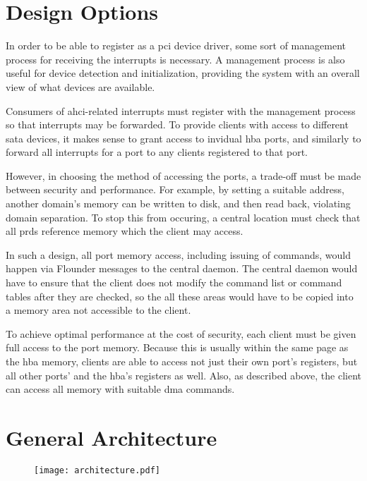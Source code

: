 \section{Design Options}

In order to be able to register as a \acs{pci} device driver, some sort of
management process for receiving the interrupts is necessary. A management
process is also useful for device detection and initialization, providing the
system with an overall view of what devices are available.

Consumers of \ac{ahci}-related interrupts must register with the management
process so that interrupts may be forwarded. To provide clients with access to
different \ac{sata} devices, it makes sense to grant access to invidual
\ac{hba} ports, and similarly to forward all interrupts for a port to any
clients registered to that port.

However, in choosing the method of accessing the ports, a trade-off must be
made between security and performance. For example, by setting a suitable
address, another domain's memory can be written to disk, and then read back,
violating domain separation. To stop this from occuring, a central location
must check that all \acp{prd} reference memory which the client may access.

In such a design, all port memory access, including issuing of commands, would
happen via Flounder messages to the central daemon. The central daemon would
have to ensure that the client does not modify the command list or command
tables after they are checked, so the all these areas would have to be copied
into a memory area not accessible to the client.

To achieve optimal performance at the cost of security, each client must be
given full access to the port memory. Because this is usually within the same
page as the \ac{hba} memory, clients are able to access not just their own
port's registers, but all other ports' and the \ac{hba}'s registers as well.
Also, as described above, the client can access all memory with suitable
\acs{dma} commands.

\section{General Architecture}

\begin{figure}[ht]
\centering
\texttt{[image: architecture.pdf]}
\label{fig:architecture}
\end{figure}

